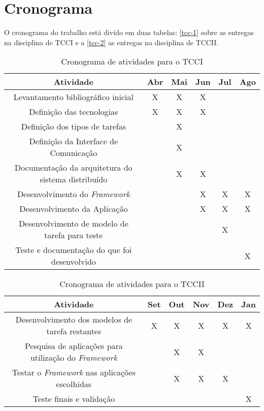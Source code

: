 \chapter{Cronograma}
\label{cronograma}
O cronograma do trabalho está divido em duas tabelas: \autoref{tcc-1} sobre as entregas na disciplina de TCCI
e a \autoref{tcc-2} as entregas na disciplina de TCCII.

\begin{table}[h]
  \begin{center}
  	\caption{\label{tcc-1}Cronograma de atividades para o TCCI}
  	\begin{tabular}{c{4cm} c{2cm} c{2cm} c{2cm} c{2cm} c{2cm}}
      \hline
      Atividade & Abr & Mai & Jun & Jul & Ago \\
      \hline
      \hline
      Levantamento bibliográfico inicial & X & X & X \\
      \hline
      Definição das tecnologias & X & X & X \\
      \hline
      Definição dos tipos de tarefas &  & X \\
      \hline
      Definição da Interface de Comunica\c{c}\~{a}o &  & X \\
      \hline
      Documentação da arquitetura do sistema distribuído & & X & X \\
      \hline
      Desenvolvimento do \emph{Framework} & & & X & X & X \\
      \hline
      Desenvolvimento da Aplicação & & & X & X & X \\
      \hline
      Desenvolvimento de modelo de tarefa para teste & & & & X  \\
      \hline
      Teste e documentação do que foi desenvolvido & & & &  & X \\
      \hline
  	\end{tabular}
  \end{center}
\end{table}

\begin{table}[h]
  \begin{center}
  	\caption{\label{tcc-2}Cronograma de atividades para o TCCII}
  	\begin{tabular}{c{5cm} c{2cm} c{2cm} c{2cm} c{2cm} c{2cm}}
      \hline
      Atividade & Set & Out & Nov & Dez & Jan \\
      \hline
      \hline
      Desenvolvimento dos modelos de tarefa restantes & X & X & X & X & X\\
      \hline
      Pesquisa de aplicações para utilização do \emph{Framework}  &  & X & X \\
      \hline
      Testar o \emph{Framework} nas aplicações escolhidas & & X & X & X \\
      \hline
      Teste finais e validação & & & & & X \\
      \hline
  	\end{tabular}
  \end{center}
\end{table}

